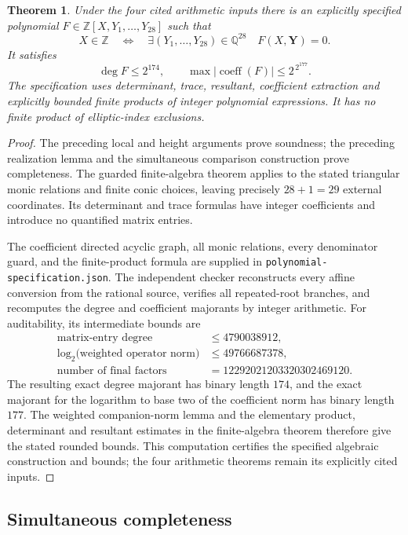 \documentclass[11pt,a4paper]{article}
\newtheorem{theorem}{Theorem}[section]
\theoremstyle{definition}
\theoremstyle{remark}
\begin{document}
\begin{theorem}
\label{thm:fixed-prime-29}
Under the four cited arithmetic inputs there is an explicitly specified
polynomial $F\in\mathbb Z[X,Y_1,\ldots,Y_{28}]$ such that
\[
 X\in\mathbb Z\quad\Longleftrightarrow\quad
 \exists (Y_1,\ldots,Y_{28})\in\mathbb Q^{28}\quad F(X,\boldsymbol Y)=0.
\]
It satisfies
\[
                  \deg F\le2^{174},\qquad
                  \max|\operatorname{coeff}(F)|\le2^{\,2^{177}}.
\]
The specification uses determinant, trace, resultant, coefficient
extraction and explicitly bounded finite products of integer polynomial
expressions. It has no finite product of elliptic-index exclusions.
\end{theorem}
\begin{proof}
The preceding local and height arguments prove soundness; the preceding
realization lemma and the simultaneous comparison construction prove
completeness. The guarded finite-algebra theorem applies to the stated
triangular monic relations and finite conic choices, leaving precisely
$28+1=29$ external coordinates. Its determinant and trace formulas have
integer coefficients and introduce no quantified matrix entries.

The coefficient directed acyclic graph, all monic relations, every
denominator guard, and the finite-product formula are supplied in
\texttt{polynomial-specification.json}. The independent checker
reconstructs every affine conversion from the rational source, verifies
all repeated-root branches, and recomputes the degree and coefficient
majorants by integer arithmetic. For auditability, its intermediate
bounds are
\[
 \begin{aligned}
 \text{matrix-entry degree}&\le4790038912,\\
 \log_2\text{(weighted operator norm)}&\le49766687378,\\
 \text{number of final factors}&=12292021203320302469120.
 \end{aligned}
\]
The resulting exact degree majorant has binary length $174$, and the
exact majorant for the logarithm to base two of the coefficient norm
has binary length $177$. The weighted companion-norm lemma and the elementary product, determinant and
resultant estimates in the finite-algebra theorem therefore give the
stated rounded bounds. This computation certifies the specified
algebraic construction and bounds; the four arithmetic theorems remain
its explicitly cited inputs.
\end{proof}
\subsection{Simultaneous completeness}
\end{document}
